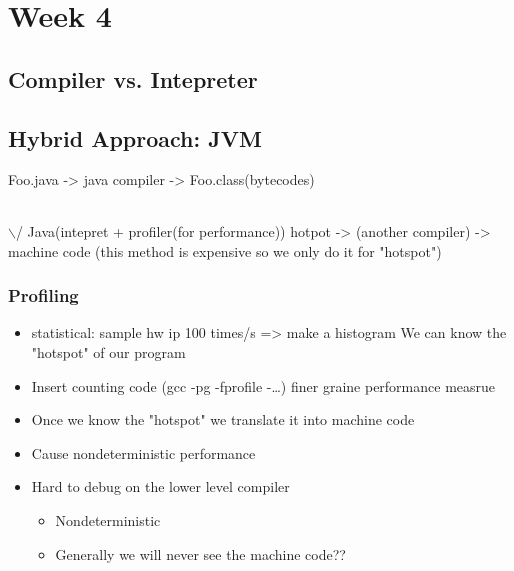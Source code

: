 \documentclass[11pt]{article}
\begin{document}
\section{Week 4}
\label{sec:org87a8f35}

\subsection{Compiler vs. Intepreter}
\label{sec:orgc70d434}


\subsection{Hybrid Approach: JVM}
\label{sec:org0ccf83b}

Foo.java -> java compiler -> Foo.class(bytecodes)
\begin{center}
\begin{tabular}{l}
\\
\end{tabular}
\end{center}
$\backslash$/
Java(intepret + profiler(for performance))
hotpot -> (another compiler) -> machine code
(this method is expensive so we only do it for "hotspot")

\subsubsection{Profiling}
\label{sec:orgc5ee857}
\begin{itemize}
\item statistical: sample hw ip 100 times/s => make a histogram
We can know the "hotspot" of our program

\item Insert counting code (gcc -pg -fprofile -\ldots{})
finer graine performance measrue

\item Once we know the "hotspot" we translate it into machine code

\item Cause nondeterministic performance

\item Hard to debug on the lower level compiler
\begin{itemize}
\item Nondeterministic
\item Generally we will never see the machine code??
\end{itemize}
\end{itemize}
\end{document}
